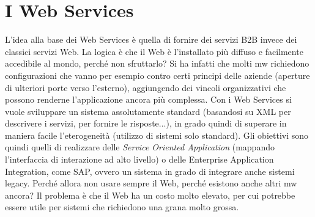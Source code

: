 \section{I Web Services}
L'idea alla base dei Web Services è quella di fornire dei servizi B2B invece dei classici servizi Web. La logica è che
il Web è l'installato più diffuso e facilmente accedibile al mondo, perché non sfruttarlo?
Si ha infatti che molti mw richiedono configurazioni che vanno per esempio contro certi principi delle aziende 
(aperture di ulteriori porte verso l'esterno), aggiungendo dei vincoli organizzativi che possono renderne 
l'applicazione ancora più complessa.
Con i Web Services si vuole sviluppare un sistema assolutamente standard (basandosi su XML per descrivere i servizi, 
per fornire le risposte...), in grado quindi di superare in maniera facile l'eterogeneità (utilizzo di sistemi solo
standard). Gli obiettivi sono quindi quelli di realizzare delle \textit{Service Oriented Application} (mappando
l'interfaccia di interazione ad alto livello) o delle Enterprise Application Integration, come SAP, ovvero un sistema
in grado di integrare anche sistemi legacy.
Perché allora non usare sempre il Web, perché esistono anche altri mw ancora? Il problema è che il Web ha un costo 
molto elevato, per cui potrebbe essere utile per sistemi che richiedono una grana molto grossa.
